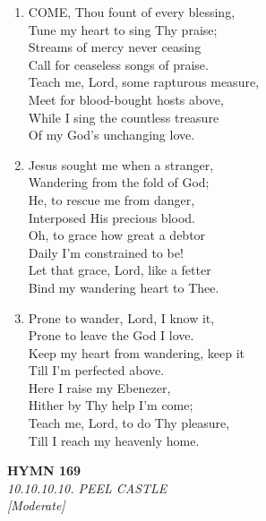 \begin{enumerate}
    \item COME, Thou fount of every blessing, \\
        Tune my heart to sing Thy praise; \\
        Streams of mercy never ceasing \\
        Call for ceaseless songs of praise. \\
        Teach me, Lord, some rapturous measure, \\
        Meet for blood-bought hosts above, \\
        While I sing the countless treasure \\
        Of my God's unchanging love.

    \item Jesus sought me when a stranger, \\
        Wandering from the fold of God; \\
        He, to rescue me from danger, \\
        Interposed His precious blood. \\
        Oh, to grace how great a debtor \\
        Daily I'm constrained to be! \\
        Let that grace, Lord, like a fetter \\
        Bind my wandering heart to Thee.

    \item Prone to wander, Lord, I know it, \\
        Prone to leave the God I love. \\
        Keep my heart from wandering, keep it \\
        Till I'm perfected above. \\
        Here I raise my Ebenezer, \\
        Hither by Thy help I'm come; \\
        Teach me, Lord, to do Thy pleasure, \\
        Till I reach my heavenly home.

\end{enumerate}

\newpage
\begin{center}
    {\Large \textbf{HYMN 169}}
    \\
    \textit{10.10.10.10. PEEL CASTLE}
    \\
    \textit{\small [Moderate]}
\end{center}
\vspace{1em}

